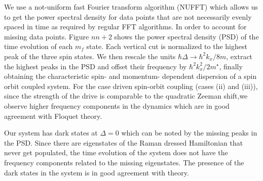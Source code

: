 

We use a not-uniform fast Fourier transform algorithm (NUFFT) which allows us to get the power spectral density for data points that are not necessarily evenly spaced in time as required by regular FFT algorithms. In order to account for missing data points. Figure $nn+2$ shows the power spectral density (PSD) of the time evolution of each $m_f$ state. Each vertical cut is normalized to the highest peak of the three spin states. We then rescale the units $\hbar\Delta\rightarrow	 \hbar^2k_x/8m$, extract the highest peaks in the PSD and offset their frequency by $\hbar^2k_x^2/2m^{\star}$, finally obtaining the characteristic spin- and momentum- dependent dispersion of a spin orbit coupled system. For the case driven spin-orbit coupling (cases (ii) and (iii)), since the strength of the drive is comparable to the quadratic Zeeman shift,we observe higher frequency components in the dynamics which are in good agreement with Floquet theory.

Our system has dark states at $\Delta=0$ which can be noted by the missing peaks in the PSD. Since there are eigenstates of the Raman dressed Hamiltonian that never get populated, the time evolution of the system does not have the frequency components related to the missing eigenstates. The presence of the dark states in the system is in good agreement with theory. 
